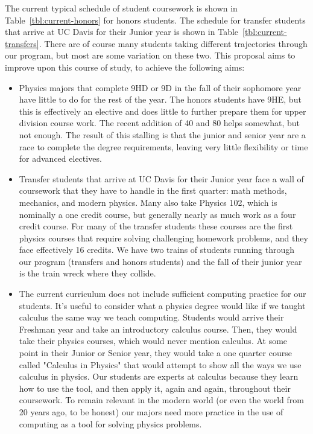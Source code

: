 \documentclass[12pt]{article}
\begin{document}
The current typical schedule of student coursework is shown in Table~\ref{tbl:current-honors} for honors students.  The schedule for transfer students that arrive at UC Davis for their Junior year is shown in Table~\ref{tbl:current-transfers}.  There are of course many students taking different trajectories through our program, but most are some variation on these two.  This proposal aims to improve upon this course of study, to achieve the following aims:
\begin{itemize}

\item Physics majors that complete 9HD or 9D in the fall of their sophomore year have little to do for the rest of the year.  The honors students have 9HE, but this is effectively an elective and does little to further prepare them for upper division course work.  The recent addition of 40 and 80 helps somewhat, but not enough.  The result of this stalling is that the junior and senior year are a race to complete the degree requirements, leaving very little flexibility or time for advanced electives.

\item Transfer students that arrive at UC Davis for their Junior year face a wall of coursework that they have to handle in the first quarter: math methods, mechanics, and modern physics.  Many also take Physics 102, which is nominally a one credit course, but generally nearly as much work as a four credit course.  For many of the transfer students these courses are the first physics courses that require solving challenging homework problems, and they face effectively 16 credits.  We have two trains of students running through our program (transfers and honors students) and the fall of their junior year is the train wreck where they collide.

\item The current curriculum does not include sufficient computing practice for our students.  It's useful to consider what a physics degree would like if we taught calculus the same way we teach computing.  Students would arrive their Freshman year and take an introductory calculus course.  Then, they would take their physics courses, which would never mention calculus.  At some point in their Junior or Senior year, they would take a one quarter course called "Calculus in Physics" that would attempt to show all the ways we use calculus in physics.  Our students are experts at calculus because they learn how to use the tool, and then apply it, again and again, throughout their coursework.  To remain relevant in the modern world (or even the world from 20 years ago, to be honest) our majors need more practice in the use of computing as a tool for solving physics problems.


\end{itemize}
\end{document}
